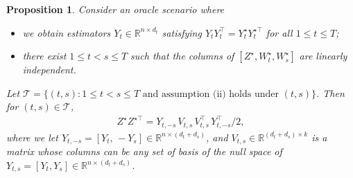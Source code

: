 \documentclass[12pt]{article}
\newcommand{\blue}[1]{\textcolor{blue}{#1}}
\newtheorem{proposition}{Proposition}
\begin{document}
\begin{proposition}\label{prop:yqtoz} Consider an oracle scenario where 
\begin{itemize}\setlength{\itemsep}{0pt}
    \item[(i)] we obtain estimators ${Y}_t \in \mathbb{R}^{n\times d_t}$ satisfying   ${Y}_t{Y}_t^{\top}=Y_t^{\star}Y_t^{\star\top}$ for all $1\leqslant t \leqslant T$; 
    \item[(ii)] there exist  $1\leqslant t< s \leqslant T$ such that  the columns of $[Z^{\star}, W_t^{\star},  W_s^{\star}]$ are linearly independent. 
\end{itemize} 
Let $\mathcal{T} = \{(t,s): 1\leqslant t <s\leqslant T \text{ and assumption (ii)  holds under } (t,s)  \}$. 
Then for $(t,s)\in \mathcal{T}$, %
\begin{align}\label{eq:yqretrievez_lm}
   Z^{\star}  Z^{\star\top} = Y_{t,-s}\, V_{t,s} \, V_{t,s}^{\top}\, Y_{t,-s}^{\top}/2 , 
\end{align}
where 
we let $Y_{t,-s}=[Y_t,\, - Y_s] \in \mathbb{R}^{n\times (d_t+d_s)}$, and 
$V_{t,s}\in \mathbb{R}^{(d_t+d_s) \times k}$ is a matrix whose columns can be any set of basis of the null space of $Y_{t,s} = [Y_t, Y_s] \in \mathbb{R}^{n\times (d_t+d_s)}$. 



\end{proposition}
\end{document}
